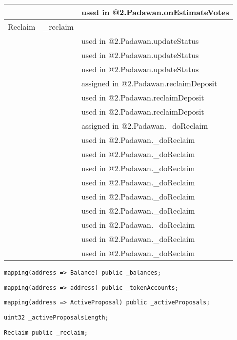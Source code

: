 \begin{tabular}{|l|l|p{5cm}|}
 & & used in @2.Padawan.onEstimateVotes\\\hline
Reclaim & \_{}reclaim &  \\\hline
 & & used in @2.Padawan.updateStatus\\\hline
 & & used in @2.Padawan.updateStatus\\\hline
 & & used in @2.Padawan.updateStatus\\\hline
 & & assigned in @2.Padawan.reclaimDeposit\\\hline
 & & used in @2.Padawan.reclaimDeposit\\\hline
 & & used in @2.Padawan.reclaimDeposit\\\hline
 & & assigned in @2.Padawan.\_{}doReclaim\\\hline
 & & used in @2.Padawan.\_{}doReclaim\\\hline
 & & used in @2.Padawan.\_{}doReclaim\\\hline
 & & used in @2.Padawan.\_{}doReclaim\\\hline
 & & used in @2.Padawan.\_{}doReclaim\\\hline
 & & used in @2.Padawan.\_{}doReclaim\\\hline
 & & used in @2.Padawan.\_{}doReclaim\\\hline
 & & used in @2.Padawan.\_{}doReclaim\\\hline
 & & used in @2.Padawan.\_{}doReclaim\\\hline
 & & used in @2.Padawan.\_{}doReclaim\\\hline
\end{tabular}
\fi


\begin{lstlisting}[firstnumber=35]
    mapping(address => Balance) public _balances;
\end{lstlisting}

\begin{lstlisting}[firstnumber=36]
    mapping(address => address) public _tokenAccounts;
\end{lstlisting}

\begin{lstlisting}[firstnumber=37]
    mapping(address => ActiveProposal) public _activeProposals;
\end{lstlisting}

\begin{lstlisting}[firstnumber=38]
    uint32 _activeProposalsLength;
\end{lstlisting}

\begin{lstlisting}[firstnumber=40]
    Reclaim public _reclaim;
\end{lstlisting}

